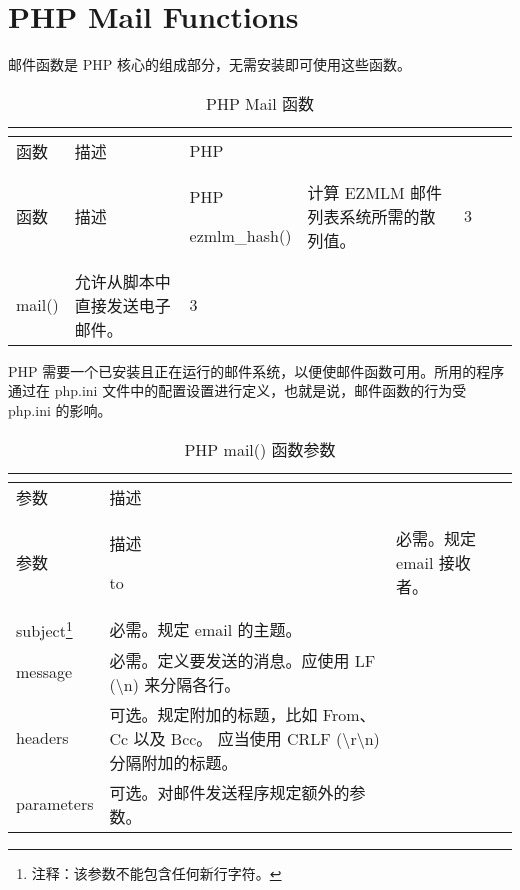 \section{PHP Mail Functions}

邮件函数是 PHP 核心的组成部分，无需安装即可使用这些函数。

\begin{longtable}{|m{120pt}|m{250pt}|m{20pt}|}
\tabularnewline\hline
函数	&描述	&PHP
\endhead

\caption{PHP Mail 函数}\\
\hline
函数	&描述	&PHP
\endfirsthead

\endfoot

\endlastfoot

\hline
ezmlm\_hash()	&计算 EZMLM 邮件列表系统所需的散列值。	&3\\
\hline
mail()			&允许从脚本中直接发送电子邮件。	&3\\
\hline
\end{longtable}

PHP 需要一个已安装且正在运行的邮件系统，以便使邮件函数可用。所用的程序通过在 php.ini 文件中的配置设置进行定义，也就是说，邮件函数的行为受 php.ini 的影响。





\begin{longtable}{|m{100pt}|m{280pt}|}
\tabularnewline\hline
参数	&描述
\endhead

\caption{PHP mail() 函数参数}\\
\hline
参数	&描述
\endfirsthead

\endfoot

\endlastfoot
\hline
to			&必需。规定 email 接收者。\\
\hline
subject\footnote{注释：该参数不能包含任何新行字符。}		&必需。规定 email 的主题。\\
\hline
message	&必需。定义要发送的消息。应使用 LF ({\textbackslash}n) 来分隔各行。\\
\hline
headers		&可选。规定附加的标题，比如 From、Cc 以及 Bcc。
			\newline 应当使用 CRLF ({\textbackslash}r{\textbackslash}n) 分隔附加的标题。\\
\hline
parameters	&可选。对邮件发送程序规定额外的参数。\\
\hline
\end{longtable}
















